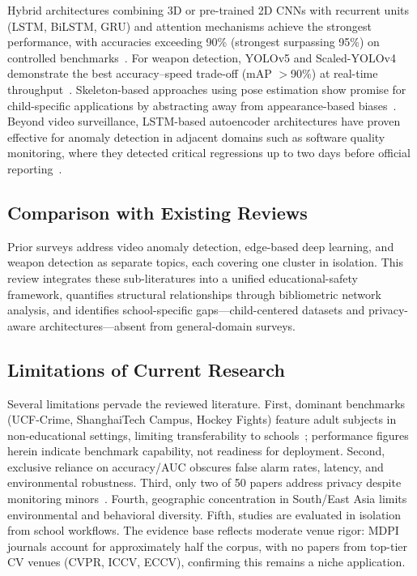 \documentclass[conference]{IEEEtran}
\begin{document}
Hybrid architectures combining 3D or pre-trained 2D CNNs with recurrent units (LSTM, BiLSTM, GRU) and attention mechanisms achieve the strongest performance, with accuracies exceeding 90\% (strongest surpassing 95\%) on controlled benchmarks~\cite{b17,b18,b2}. For weapon detection, YOLOv5 and Scaled-YOLOv4 demonstrate the best accuracy--speed trade-off (mAP $>$90\%) at real-time throughput~\cite{b19,b9}. Skeleton-based approaches using pose estimation show promise for child-specific applications by abstracting away from appearance-based biases~\cite{b16,b20}. Beyond video surveillance, LSTM-based autoencoder architectures have proven effective for anomaly detection in adjacent domains such as software quality monitoring, where they detected critical regressions up to two days before official reporting~\cite{b24}.

\subsection{Comparison with Existing Reviews}

Prior surveys address video anomaly detection, edge-based deep learning, and weapon detection as separate topics, each covering one cluster in isolation. This review integrates these sub-literatures into a unified educational-safety framework, quantifies structural relationships through bibliometric network analysis, and identifies school-specific gaps---child-centered datasets and privacy-aware architectures---absent from general-domain surveys.

\subsection{Limitations of Current Research}

Several limitations pervade the reviewed literature. First, dominant benchmarks (UCF-Crime, ShanghaiTech Campus, Hockey Fights) feature adult subjects in non-educational settings, limiting transferability to schools~\cite{b15}; performance figures herein indicate benchmark capability, not readiness for deployment. Second, exclusive reliance on accuracy/AUC obscures false alarm rates, latency, and environmental robustness. Third, only two of 50 papers address privacy despite monitoring minors~\cite{b11}. Fourth, geographic concentration in South/East Asia limits environmental and behavioral diversity. Fifth, studies are evaluated in isolation from school workflows. The evidence base reflects moderate venue rigor: MDPI journals account for approximately half the corpus, with no papers from top-tier CV venues (CVPR, ICCV, ECCV), confirming this remains a niche application.
\end{document}
